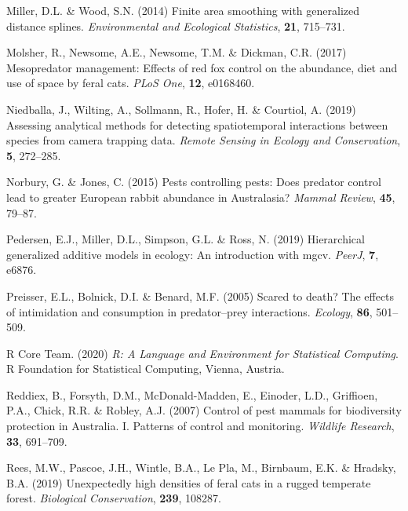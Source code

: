 \documentclass[]{elsarticle} %
\begin{document}
\leavevmode\hypertarget{ref-miller2014finite}{}%
Miller, D.L. \& Wood, S.N. (2014) Finite area smoothing with generalized distance splines. \emph{Environmental and Ecological Statistics}, \textbf{21}, 715--731.

\leavevmode\hypertarget{ref-molsher2017mesopredator}{}%
Molsher, R., Newsome, A.E., Newsome, T.M. \& Dickman, C.R. (2017) Mesopredator management: Effects of red fox control on the abundance, diet and use of space by feral cats. \emph{PLoS One}, \textbf{12}, e0168460.

\leavevmode\hypertarget{ref-niedballa2019assessing}{}%
Niedballa, J., Wilting, A., Sollmann, R., Hofer, H. \& Courtiol, A. (2019) Assessing analytical methods for detecting spatiotemporal interactions between species from camera trapping data. \emph{Remote Sensing in Ecology and Conservation}, \textbf{5}, 272--285.

\leavevmode\hypertarget{ref-norbury2015pests}{}%
Norbury, G. \& Jones, C. (2015) Pests controlling pests: Does predator control lead to greater European rabbit abundance in Australasia? \emph{Mammal Review}, \textbf{45}, 79--87.

\leavevmode\hypertarget{ref-pedersen2019hierarchical}{}%
Pedersen, E.J., Miller, D.L., Simpson, G.L. \& Ross, N. (2019) Hierarchical generalized additive models in ecology: An introduction with mgcv. \emph{PeerJ}, \textbf{7}, e6876.

\leavevmode\hypertarget{ref-preisser2005scared}{}%
Preisser, E.L., Bolnick, D.I. \& Benard, M.F. (2005) Scared to death? The effects of intimidation and consumption in predator--prey interactions. \emph{Ecology}, \textbf{86}, 501--509.

\leavevmode\hypertarget{ref-R}{}%
R Core Team. (2020) \emph{R: A Language and Environment for Statistical Computing}. R Foundation for Statistical Computing, Vienna, Austria.

\leavevmode\hypertarget{ref-reddiex2007control}{}%
Reddiex, B., Forsyth, D.M., McDonald-Madden, E., Einoder, L.D., Griffioen, P.A., Chick, R.R. \& Robley, A.J. (2007) Control of pest mammals for biodiversity protection in Australia. I. Patterns of control and monitoring. \emph{Wildlife Research}, \textbf{33}, 691--709.

\leavevmode\hypertarget{ref-rees2019unexpectedly}{}%
Rees, M.W., Pascoe, J.H., Wintle, B.A., Le Pla, M., Birnbaum, E.K. \& Hradsky, B.A. (2019) Unexpectedly high densities of feral cats in a rugged temperate forest. \emph{Biological Conservation}, \textbf{239}, 108287.
\end{document}
